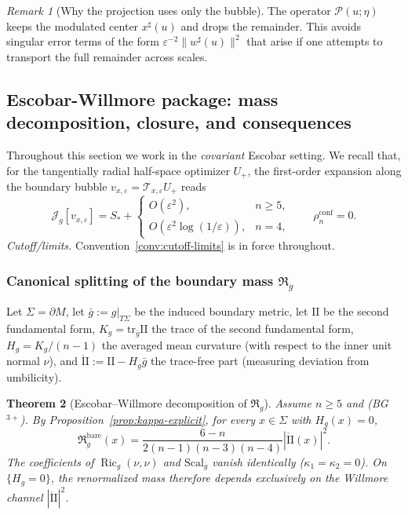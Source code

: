 \documentclass[11pt,reqno,a4paper]{amsart}
\numberwithin{equation}{section}
\theoremstyle{plain}
\newtheorem{theorem}{Theorem}[section]
\newcommand{\Scal}{\mathrm{Scal}}
\theoremstyle{remark}
\newtheorem{remark}[theorem]{Remark}
\theoremstyle{plain}
\begin{document}
\begin{remark}[Why the projection uses only the bubble]
The operator $\mathcal P(u;\eta)$ keeps the modulated center $x^\sharp(u)$ and drops the
remainder. This avoids singular error terms of the form
$\varepsilon^{-2}\|w^\sharp(u)\|^2$ that arise if one attempts to transport the full remainder
across scales.
\end{remark}


\subsection{Escobar-Willmore package: mass decomposition, closure, and consequences}\label{sec:EW-package}

Throughout this section we work in the \emph{covariant} Escobar setting.
We recall that, for the tangentially radial half-space optimizer $U_+$,
the first-order expansion along the boundary bubble $v_{x,\varepsilon}=\mathcal T_{x,\varepsilon}U_+$ reads
\[
\mathcal J_g[v_{x,\varepsilon}]
= S_\ast+
\begin{cases}
O(\varepsilon^2), & n\ge5,\\[1mm]
O\!\left(\varepsilon^2\log(1/\varepsilon)\right), & n=4,
\end{cases}
\qquad \rho_n^{\mathrm{conf}}=0.
\]
\emph{Cutoff/limits.} Convention~\ref{conv:cutoff-limits} is in force throughout.

\subsubsection{Canonical splitting of the boundary mass $\mathfrak R_g$}

Let $\Sigma=\partial M$, let $\bar g:=g|_{T\Sigma}$ be the induced boundary metric, let $\mathrm{II}$ be the second fundamental form, $K_g=\mathrm{tr}_{\bar g} \mathrm{II}$ the trace of the second fundamental form, $H_g=K_g/(n-1)$ the averaged mean curvature (with respect
to the inner unit normal $\nu$), and $\mathring{\mathrm{II}}:=\mathrm{II}-H_g\bar g$ the trace-free part (measuring deviation from umbilicity).


\begin{theorem}[Escobar--Willmore decomposition of $\mathfrak R_g$]
\label{thm:mass-decomp}
Assume $n\ge5$ and \textup{(BG$^{3+}$)}.
By Proposition~\ref{prop:kappa-explicit}, for every $x\in\Sigma$ with $H_g(x)=0$,
\begin{equation}\label{eq:EW-decomp}
\mathfrak R_g^{\mathrm{bare}}(x)
= \frac{6-n}{2(n-1)(n-3)(n-4)}|\mathring{\mathrm{II}}(x)|^2.
\end{equation}
The coefficients of $\operatorname{Ric}_g(\nu,\nu)$ and $\Scal_{\bar g}$
vanish identically ($\kappa_1=\kappa_2=0$).
On $\{H_g=0\}$, the renormalized mass therefore depends \emph{exclusively} on the Willmore channel
$|\mathring{\mathrm{II}}|^2$.
\end{theorem}
\end{document}
